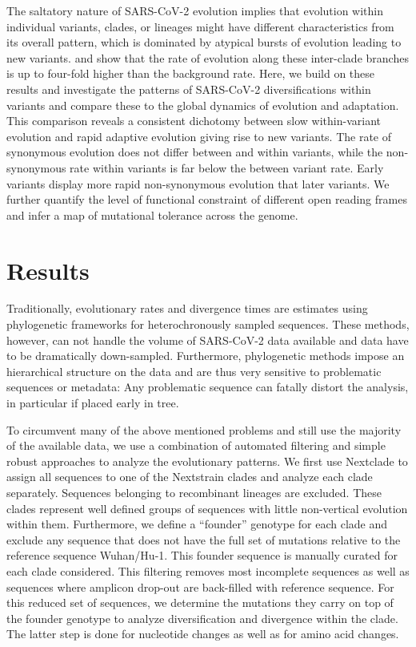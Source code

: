 \documentclass[aps,rmp, twocolumn]{revtex4}
\begin{document}
The saltatory nature of SARS-CoV-2 evolution implies that evolution within individual variants, clades, or lineages might have different characteristics from its overall pattern, which is dominated by atypical bursts of evolution leading to new variants.
\citet{tay_emergence_2022} and \citet{hill_origins_2022} show that the rate of evolution along these inter-clade branches is up to four-fold higher than the background rate.
Here, we build on these results and investigate the patterns of SARS-CoV-2 diversifications within variants and compare these to the global dynamics of evolution and adaptation.
This comparison reveals a consistent dichotomy between slow within-variant evolution and rapid adaptive evolution giving rise to new variants.
The rate of synonymous evolution does not differ between and within variants, while the non-synonymous rate within variants is far below the between variant rate.
Early variants display more rapid non-synonymous evolution that later variants.
We further quantify the level of functional constraint of different open reading frames and infer a map of mutational tolerance across the genome.

\section*{Results}

Traditionally, evolutionary rates and divergence times are estimates using phylogenetic frameworks for heterochronously sampled sequences.
These methods, however, can not handle the volume of SARS-CoV-2 data available and data have to be dramatically down-sampled.
Furthermore, phylogenetic methods impose an hierarchical structure on the data and are thus very sensitive to problematic sequences or metadata: Any problematic sequence can fatally distort the analysis, in particular if placed early in tree.

To circumvent many of the above mentioned problems and still use the majority of the available data, we use a combination of automated filtering and simple robust approaches to analyze the evolutionary patterns.
We first use Nextclade \citep{aksamentov_nextclade_2021} to assign all sequences to one of the Nextstrain clades \citep{hadfield_nextstrain_2018} and analyze each clade separately.
Sequences belonging to recombinant lineages are excluded.
These clades represent well defined groups of sequences with little non-vertical evolution within them.
Furthermore, we define a ``founder'' genotype for each clade and exclude any sequence that does not have the full set of mutations relative to the reference sequence Wuhan/Hu-1.
This founder sequence is manually curated for each clade considered.
This filtering removes most incomplete sequences as well as sequences where amplicon drop-out are back-filled with reference sequence.
For this reduced set of sequences, we determine the mutations they carry on top of the founder genotype to analyze diversification and divergence within the clade.
The latter step is done for nucleotide changes as well as for amino acid changes.
\end{document}
